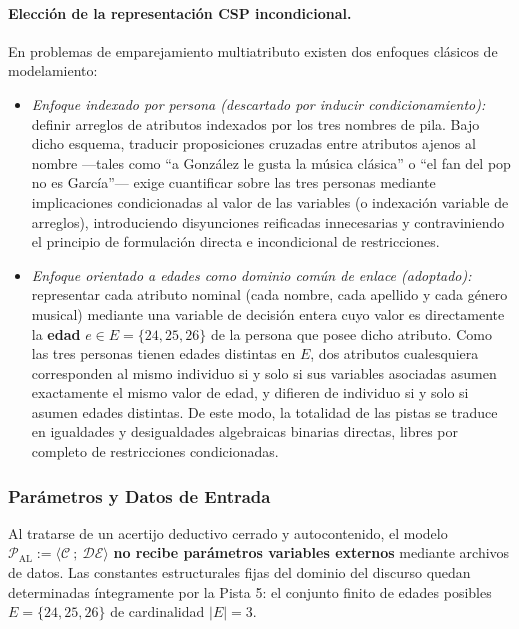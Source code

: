 \paragraph{Elección de la representación CSP incondicional.}
En problemas de emparejamiento multiatributo existen dos enfoques clásicos de modelamiento:
\begin{itemize}
    \item \emph{Enfoque indexado por persona (descartado por inducir condicionamiento):} definir arreglos de atributos indexados por los tres nombres de pila. Bajo dicho esquema, traducir proposiciones cruzadas entre atributos ajenos al nombre —tales como ``a González le gusta la música clásica'' o ``el fan del pop no es García''— exige cuantificar sobre las tres personas mediante implicaciones condicionadas al valor de las variables (o indexación variable de arreglos), introduciendo disyunciones reificadas innecesarias y contraviniendo el principio de formulación directa e incondicional de restricciones.
    \item \emph{Enfoque orientado a edades como dominio común de enlace (adoptado):} representar cada atributo nominal (cada nombre, cada apellido y cada género musical) mediante una variable de decisión entera cuyo valor es directamente la \textbf{edad} $e \in E = \{24, 25, 26\}$ de la persona que posee dicho atributo. Como las tres personas tienen edades distintas en $E$, dos atributos cualesquiera corresponden al mismo individuo si y solo si sus variables asociadas asumen exactamente el mismo valor de edad, y difieren de individuo si y solo si asumen edades distintas. De este modo, la totalidad de las pistas se traduce en igualdades y desigualdades algebraicas binarias directas, libres por completo de restricciones condicionadas.
\end{itemize}

\subsubsection{Parámetros y Datos de Entrada}

Al tratarse de un acertijo deductivo cerrado y autocontenido, el modelo $\mathcal{P}_{\text{AL}} := \langle \mathcal{C} \ ; \ \mathcal{DE} \rangle$ \textbf{no recibe parámetros variables externos} mediante archivos de datos. Las constantes estructurales fijas del dominio del discurso quedan determinadas íntegramente por la Pista 5: el conjunto finito de edades posibles $E = \{24, 25, 26\}$ de cardinalidad $|E| = 3$.


